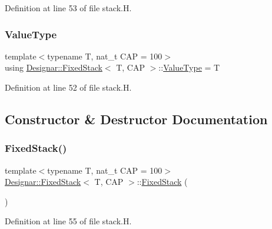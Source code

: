 Definition at line 53 of file stack.\+H.

\mbox{\label{class_designar_1_1_fixed_stack_ad69de4dde252c1a48054ce62fbf05e95}} 
\subsubsection{\texorpdfstring{Value\+Type}{ValueType}}
{\footnotesize\ttfamily template$<$typename T, nat\+\_\+t C\+AP = 100$>$ \\
using \hyperlink{class_designar_1_1_fixed_stack}{Designar\+::\+Fixed\+Stack}$<$ T, C\+AP $>$\+::\hyperlink{class_designar_1_1_fixed_stack_ad69de4dde252c1a48054ce62fbf05e95}{Value\+Type} =  T}



Definition at line 52 of file stack.\+H.



\subsection{Constructor \& Destructor Documentation}
\mbox{\label{class_designar_1_1_fixed_stack_a0c590a0c0a634d22c71234023f85dc2e}} 
\subsubsection{\texorpdfstring{Fixed\+Stack()}{FixedStack()}\hspace{0.1cm}{\footnotesize\ttfamily [1/3]}}
{\footnotesize\ttfamily template$<$typename T, nat\+\_\+t C\+AP = 100$>$ \\
\hyperlink{class_designar_1_1_fixed_stack}{Designar\+::\+Fixed\+Stack}$<$ T, C\+AP $>$\+::\hyperlink{class_designar_1_1_fixed_stack}{Fixed\+Stack} (\begin{DoxyParamCaption}{ }\end{DoxyParamCaption})\hspace{0.3cm}{\ttfamily [inline]}}



Definition at line 55 of file stack.\+H.

